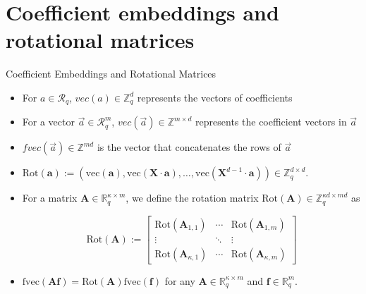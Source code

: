 \section{Coefficient embeddings and rotational matrices}
\begin{frame}
    {Coefficient Embeddings and Rotational Matrices}
    \begin{itemize}
        \item For $a \in \mathcal{R}_q$, $vec(a) \in \mathbb{Z}^d_q$ represents the vectors of coefficients
        \item For a vector $\overrightarrow{a} \in \mathcal{R}^m_q$, $vec(\overrightarrow{a}) \in \mathbb{Z}^{m \times d}$ represents the coefficient vectors in $\overrightarrow{a}$
        \item $fvec(\overrightarrow{a}) \in \mathbb{Z}^{md}$ is the vector that concatenates the rows of $\overrightarrow{a}$
    \end{itemize}

    \begin{itemize}
        \item $\text{Rot}(\mathbf{a}) := (\text{vec}(\mathbf{a}), \text{vec}(\mathbf{X} \cdot \mathbf{a}), \ldots, \text{vec}(\mathbf{X}^{d-1} \cdot \mathbf{a})) \in \mathbb{Z}_q^{d \times d}$.
        \item
              For a matrix $\mathbf{A} \in \mathbb{R}_q^{\kappa \times m}$, we define the rotation matrix $\text{Rot}(\mathbf{A}) \in \mathbb{Z}_q^{\kappa d \times md}$ as

              \[
                  \text{Rot}(\mathbf{A}) :=
                  \begin{bmatrix}
                      \text{Rot}(\mathbf{A}_{1,1})      & \cdots & \text{Rot}(\mathbf{A}_{1,m})      \\
                      \vdots                            & \ddots & \vdots                            \\
                      \text{Rot}(\mathbf{A}_{\kappa,1}) & \cdots & \text{Rot}(\mathbf{A}_{\kappa,m})
                  \end{bmatrix}
              \]

        \item $\text{fvec}(\mathbf{A} \mathbf{f}) = \text{Rot}(\mathbf{A})\text{fvec}(\mathbf{f})$ for any $\mathbf{A} \in \mathbb{R}_q^{\kappa \times m}$ and $\mathbf{f} \in \mathbb{R}_q^m$.
    \end{itemize}

\end{frame}